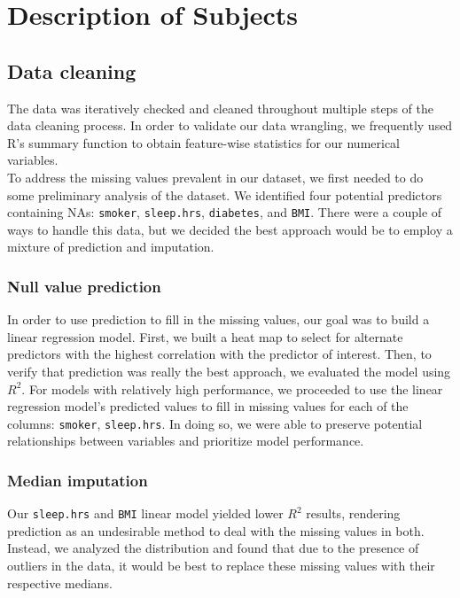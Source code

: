\documentclass{article}
\begin{document}
\section*{Description of Subjects}
\subsection*{Data cleaning}
The data was iteratively checked and cleaned throughout multiple steps of the data cleaning process. In order to validate our data wrangling, we frequently used R’s summary function to obtain feature-wise statistics for our numerical variables. \\

\noindent To address the missing values prevalent in our dataset, we first needed to do some preliminary analysis of the dataset. We identified four potential predictors containing NAs: \verb|smoker|, \verb|sleep.hrs|, \verb|diabetes|, and \verb|BMI|. There were a couple of ways to handle this data, but we decided the best approach would be to employ a mixture of prediction and imputation. 

\subsubsection*{Null value prediction}
In order to use prediction to fill in the missing values, our goal was to build a linear regression model. First, we built a heat map to select for alternate predictors with the highest correlation with the predictor of interest. Then, to verify that prediction was really the best approach, we evaluated the model using $R^2$. For models with relatively high performance, we proceeded to use the linear regression model’s predicted values to fill in missing values for each of the columns: \verb|smoker|, \verb|sleep.hrs|. In doing so, we were able to preserve potential relationships between variables and prioritize model performance.
\subsubsection*{Median imputation}
Our \verb|sleep.hrs| and \verb|BMI| linear model yielded lower $R^2$ results, rendering prediction as an undesirable method to deal with the missing values in both. Instead, we analyzed the distribution and found that due to the presence of outliers in the data, it would be best to replace these missing values with their respective medians.
\end{document}
